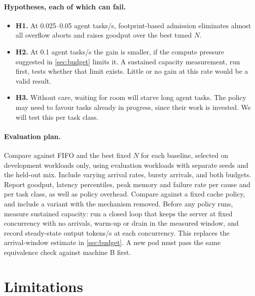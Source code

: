 \paragraph{Hypotheses, each of which can fail.}
\begin{itemize}
  \item \textbf{H1.} At 0.025--0.05 agent tasks/s, footprint-based admission eliminates almost all overflow aborts and raises goodput over the best tuned $N$.
  \item \textbf{H2.} At 0.1 agent tasks/s the gain is smaller, if the compute pressure suggested in \cref{sec:budget} limits it. A sustained capacity measurement, run first, tests whether that limit exists. Little or no gain at this rate would be a valid result.
  \item \textbf{H3.} Without care, waiting for room will starve long agent tasks. The policy may need to favour tasks already in progress, since their work is invested. We will test this per task class.
\end{itemize}

\paragraph{Evaluation plan.} Compare against FIFO and the best fixed $N$ for each baseline, selected on development workloads only, using evaluation workloads with separate seeds and the held-out mix. Include varying arrival rates, bursty arrivals, and both budgets. Report goodput, latency percentiles, peak memory and failure rate per cause and per task class, as well as policy overhead. Compare against a fixed cache policy, and include a variant with the mechanism removed. Before any policy runs, measure sustained capacity: run a closed loop that keeps the server at fixed concurrency with no arrivals, warm-up or drain in the measured window, and record steady-state output tokens/s at each concurrency. This replaces the arrival-window estimate in \cref{sec:budget}. A new pod must pass the same equivalence check against machine B first.

\section{Limitations}\label{sec:limitations}

